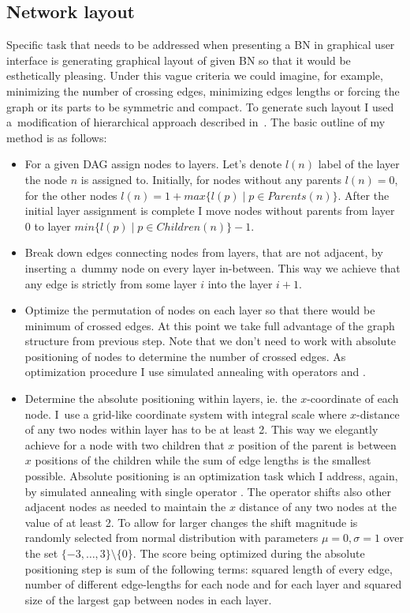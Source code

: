 \documentclass[english,cover]{fitthesis} %
\begin{document}
\subsection{Network layout}
Specific task that needs to be addressed when presenting a BN in graphical user interface is generating graphical layout of given BN so that it would be esthetically pleasing. Under this vague criteria we could imagine, for example, minimizing the number of crossing edges, minimizing edges lengths or forcing the graph or its parts to be symmetric and compact. To generate such layout I used a~modification of hierarchical approach described in~\cite[p.~22]{graph_drawing}. The basic outline of my method is as follows:
\begin{itemize}
	\item For a given DAG assign nodes to layers. Let's denote $l(n)$ label of the layer the node $n$ is assigned to. Initially, for nodes without any parents $l(n)=0$, for the other nodes $l(n) = 1 + max \lbrace l(p) \mid p \in Parents(n)\rbrace$. After the initial layer assignment is complete I move nodes without parents from layer 0 to layer $min \lbrace l(p) \mid p \in Children(n)\rbrace - 1$.
	\item Break down edges connecting nodes from layers, that are not adjacent, by inserting a~dummy node on every layer in-between. This way we achieve that any edge is strictly from some layer $i$ into the layer $i+1$.
	\item Optimize the permutation of nodes on each layer so that there would be minimum of crossed edges. At this point we take full advantage of the graph structure from previous step. Note that we don't need to work with absolute positioning of nodes to determine the number of crossed edges. As optimization procedure I use simulated annealing with operators  and .
    \item Determine the absolute positioning within layers, ie. the $x$-coordinate of each node. I~use a grid-like coordinate system with integral scale where $x$-distance of any two nodes within layer has to be at least 2. This way we elegantly achieve for a node with two children that $x$ position of the parent is between $x$ positions of the children while the sum of edge lengths is the smallest possible. Absolute positioning is an optimization task which I address, again, by simulated annealing with single operator . The operator shifts also other adjacent nodes as needed to maintain the $x$ distance of any two nodes at the value of at least 2. To allow for larger changes the shift magnitude is randomly selected from normal distribution with parameters $\mu=0, \sigma = 1$ over the set $\lbrace -3, \dots, 3\rbrace \setminus \lbrace 0 \rbrace$. The score being optimized during the absolute positioning step is sum of the following terms: squared length of every edge, number of different edge-lengths for each node and for each layer and squared size of the largest gap between nodes in each layer.
\end{itemize}
\end{document}
